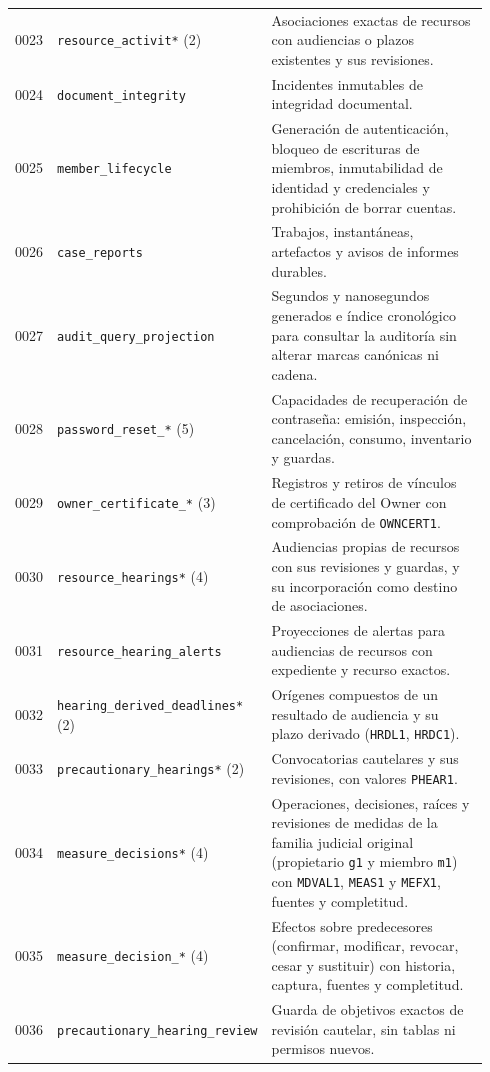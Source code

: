 \begin{longtable}{@{}C{0.06\linewidth}L{0.29\linewidth}L{0.59\linewidth}@{}}
  0023 & \texttt{resource\_activit*} (2) & Asociaciones exactas de recursos con audiencias o plazos existentes y sus revisiones. \\
  0024 & \texttt{document\_integrity} & Incidentes inmutables de integridad documental. \\
  0025 & \texttt{member\_lifecycle} & Generación de autenticación, bloqueo de escrituras de miembros, inmutabilidad de identidad y credenciales y prohibición de borrar cuentas. \\
  0026 & \texttt{case\_reports} & Trabajos, instantáneas, artefactos y avisos de informes durables. \\
  0027 & \texttt{audit\_query\_projection} & Segundos y nanosegundos generados e índice cronológico para consultar la auditoría sin alterar marcas canónicas ni cadena. \\
  0028 & \texttt{password\_reset\_*} (5) & Capacidades de recuperación de contraseña: emisión, inspección, cancelación, consumo, inventario y guardas. \\
  0029 & \texttt{owner\_certificate\_*} (3) & Registros y retiros de vínculos de certificado del Owner con comprobación de \texttt{OWNCERT1}. \\
  0030 & \texttt{resource\_hearings*} (4) & Audiencias propias de recursos con sus revisiones y guardas, y su incorporación como destino de asociaciones. \\
  0031 & \texttt{resource\_hearing\_alerts} & Proyecciones de alertas para audiencias de recursos con expediente y recurso exactos. \\
  0032 & \texttt{hearing\_derived\_deadlines*} (2) & Orígenes compuestos de un resultado de audiencia y su plazo derivado (\texttt{HRDL1}, \texttt{HRDC1}). \\
  0033 & \texttt{precautionary\_hearings*} (2) & Convocatorias cautelares y sus revisiones, con valores \texttt{PHEAR1}. \\
  0034 & \texttt{measure\_decisions*} (4) & Operaciones, decisiones, raíces y revisiones de medidas de la familia judicial original (propietario \texttt{g1} y miembro \texttt{m1}) con \texttt{MDVAL1}, \texttt{MEAS1} y \texttt{MEFX1}, fuentes y completitud. \\
  0035 & \texttt{measure\_decision\_*} (4) & Efectos sobre predecesores (confirmar, modificar, revocar, cesar y sustituir) con historia, captura, fuentes y completitud. \\
  0036 & \texttt{precautionary\_hearing\_review} & Guarda de objetivos exactos de revisión cautelar, sin tablas ni permisos nuevos. \\

\end{longtable}
